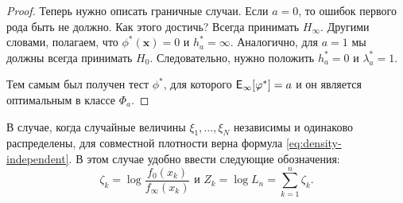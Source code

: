 \begin{proof}
	Теперь нужно описать граничные случаи. Если \(a = 0\), то ошибок первого 
	рода быть не должно. Как этого достичь? Всегда принимать \(H_{\infty}\). 
	Другими словами, полагаем, что \(\phi^{*}(\mathbf{x}) = 0\) и \(h_{a}^{*} = 
	\infty\). Аналогично, для \(a = 1\) мы должны всегда принимать \(H_{0}\). 
	Следовательно, нужно положить \(h_{a}^{*} = 0\) и \(\lambda_{a}^{*} = 1\).
	
	Тем самым был получен тест \(\phi^{*}\), для которого 
	\(\E_{\infty}[\phi^{*}] = a\) и он является оптимальным в классе 
	\(\Phi_{a}\).
\end{proof}

\begin{remark}
	В случае, когда случайные величины \(\xi_{1}, \ldots, \xi_{N}\) независимы 
	и одинаково распределены, для совместной плотности верна формула 
	\eqref{eq:density-independent}. В этом случае удобно ввести следующие 
	обозначения:
	\[
		\zeta_{k} = \log \frac{f_{0}(x_{k})}{f_{\infty}(x_{k})}  \text{ и } 
		Z_{k} = \log L_{n} = \sum_{k = 1}^{n} \zeta_{k}.
	\]
\end{remark}

